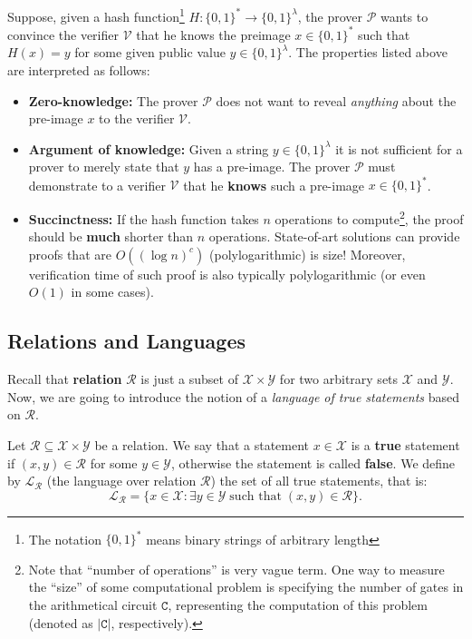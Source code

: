 \documentclass[../lecture-notes-148x210.tex]{subfiles}
\begin{document}
\begin{example}
    Suppose, given a hash function\footnote{The notation $\{0,1\}^*$ means
    binary strings of arbitrary length} $H: \{0,1\}^* \to \{0,1\}^{\lambda}$, the
    prover $\mathcal{P}$ wants to convince the verifier $\mathcal{V}$ that he
    knows the preimage $x \in \{0,1\}^*$ such that $H(x) = y$ for some given
    public value $y \in \{0,1\}^{\lambda}$. The properties listed above are
    interpreted as follows:
    \begin{itemize}
        \item \textbf{Zero-knowledge:} The prover $\mathcal{P}$ does not want to
        reveal \textit{anything} about the pre-image $x$ to the verifier
        $\mathcal{V}$.
        \item \textbf{Argument of knowledge:} Given a string $y \in
        \{0,1\}^{\lambda}$ it is not sufficient for a prover to merely state that
        $y$ has a pre-image. The prover $\mathcal{P}$ must demonstrate to a
        verifier $\mathcal{V}$ that he \textbf{knows} such a pre-image $x \in
        \{0,1\}^*$.
        \item \textbf{Succinctness:} If the hash function takes $n$ operations
        to compute\footnote{Note that ``number of operations'' is very vague
        term. One way to measure the ``size'' of some computational problem is
        specifying the number of gates in the arithmetical circuit $\mathtt{C}$,
        representing the computation of this problem (denoted as $|\mathtt{C}|$,
        respectively).}, the proof should be \textbf{much} shorter than $n$
        operations. State-of-art solutions can provide proofs that are $O((\log
        n)^c)$ (polylogarithmic) is size! Moreover, verification time of such
        proof is also typically polylogarithmic (or even $O(1)$ in some cases).
    \end{itemize}
\end{example}

\subsection{Relations and Languages}\label{section:relations_and_languages}
Recall that \textbf{relation} $\mathcal{R}$ is just a subset of $\mathcal{X}
\times \mathcal{Y}$ for two arbitrary sets $\mathcal{X}$ and $\mathcal{Y}$. Now,
we are going to introduce the notion of a \emph{language of true statements}
based on $\mathcal{R}$.

\begin{definition}
    Let $\mathcal{R} \subseteq \mathcal{X} \times \mathcal{Y}$ be a relation. We
    say that a statement $x \in \mathcal{X}$ is a \textbf{true} statement if
    $(x,y) \in \mathcal{R}$ for some $y \in \mathcal{Y}$, otherwise the
    statement is called \textbf{false}. We define by $\mathcal{L}_{\mathcal{R}}$
    (the language over relation $\mathcal{R}$) the set of all true statements,
    that is:
    \begin{equation*}
        \mathcal{L}_{\mathcal{R}} = \{ x \in \mathcal{X}: \exists y \in \mathcal{Y} \; \text{such that} \; (x,y) \in \mathcal{R} \}.
    \end{equation*}
\end{definition}
\end{document}
